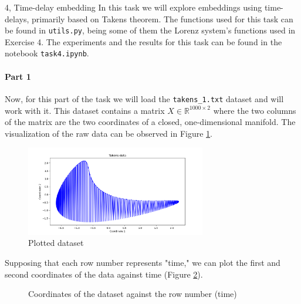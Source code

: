 \begin{task}{4, Time-delay embedding}
In this task we will explore embeddings using time-delays, primarily based on Takens theorem. The functions used for this task can be found in \verb|utils.py|, being some of them the Lorenz system's functions used in Exercise 4. The experiments and the results for this task can be found in the notebook \verb|task4.ipynb|.

\paragraph{Part 1} Now, for this part of the task we will load the \verb|takens_1.txt| dataset and will work with it. This dataset contains a matrix \(X \in \mathbb{R}^{1000\times2}\) where the two columns of the matrix are the two coordinates of a closed, one-dimensional manifold. The visualization of the raw data can be observed in Figure \ref{takens_plot}.
\begin{figure}[H]
\centering
\includegraphics[width=0.7\textwidth]{images/takens_data.png}
\caption{Plotted dataset}
\label{takens_plot}
\end{figure}

Supposing that each row number represents "time," we can plot the first and second coordinates of the data against time (Figure \ref{takens_coor}).

\begin{figure}[H]
\centering
{}
\caption{Coordinates of the dataset against the row number (time)}
\label{takens_coor}
\end{figure}


\end{task}

